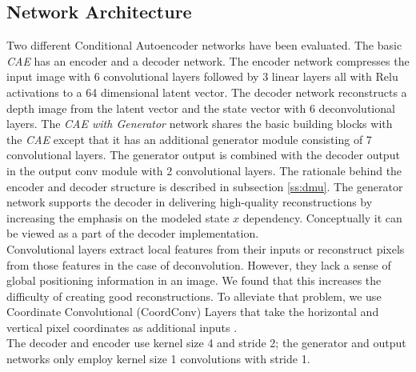 \documentclass[letterpaper, 10 pt, journal, twoside]{ieeetran}  %
\begin{document}
\subsection{Network Architecture}
\label{sub:network_architecture}
Two different Conditional Autoencoder networks have been evaluated.
The basic \textit{CAE} has an encoder and a decoder network. The encoder network compresses the input image with 6 convolutional layers followed by 3 linear layers all with Relu activations to a 64 dimensional latent vector. The decoder network reconstructs a depth image from the latent vector and the state vector with 6 deconvolutional layers.
The \textit{CAE with Generator} network shares the basic building blocks with the \textit{CAE} except that it has an additional generator module consisting of 7 convolutional layers. The generator output is combined with the decoder output in the output conv module with 2 convolutional layers. 
The rationale behind the encoder and decoder structure is described in subsection \ref{ss:dmu}. The generator network supports the decoder in delivering high-quality reconstructions by increasing the emphasis on the modeled state $x$ dependency. Conceptually it can be viewed as a part of the decoder implementation.\\
Convolutional layers extract local features from their inputs or reconstruct pixels from those features in the case of deconvolution. However, they lack a sense of global positioning information in an image. We found that this increases the difficulty of creating good reconstructions. To alleviate that problem, we use Coordinate Convolutional (CoordConv) Layers that take the horizontal and vertical pixel coordinates as additional inputs \cite{liuIntriguingFailingConvolutional2018}.\\
The decoder and encoder use kernel size 4 and stride 2; the generator and output networks only employ kernel size 1 convolutions with stride 1.
\end{document}
